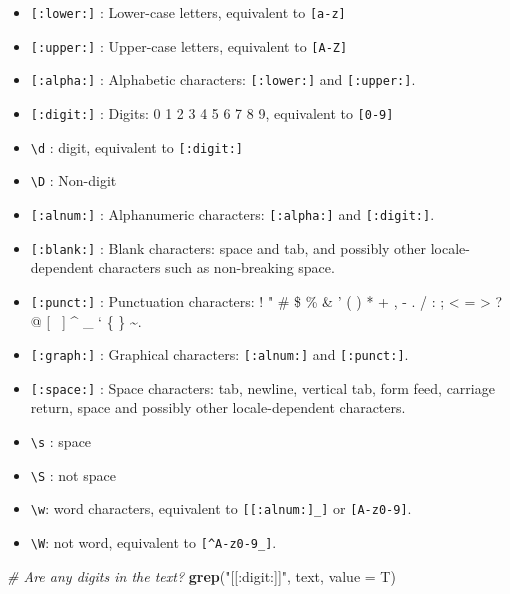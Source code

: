 \documentclass[
]{book}
\newenvironment{Shaded}{\begin{snugshade}}{\end{snugshade}}
\newcommand{\CommentTok}[1]{\textcolor[rgb]{0.56,0.35,0.01}{\textit{#1}}}
\newcommand{\DataTypeTok}[1]{\textcolor[rgb]{0.13,0.29,0.53}{#1}}
\newcommand{\KeywordTok}[1]{\textcolor[rgb]{0.13,0.29,0.53}{\textbf{#1}}}
\newcommand{\NormalTok}[1]{#1}
\newcommand{\StringTok}[1]{\textcolor[rgb]{0.31,0.60,0.02}{#1}}
\providecommand{\tightlist}{%
  \setlength{\itemsep}{0pt}\setlength{\parskip}{0pt}}
\begin{document}
\begin{itemize}
\tightlist
\item
  \texttt{{[}:lower:{]}} : Lower-case letters, equivalent to \texttt{{[}a-z{]}}
\item
  \texttt{{[}:upper:{]}} : Upper-case letters, equivalent to \texttt{{[}A-Z{]}}
\item
  \texttt{{[}:alpha:{]}} : Alphabetic characters: \texttt{{[}:lower:{]}} and \texttt{{[}:upper:{]}}.
\item
  \texttt{{[}:digit:{]}} : Digits: 0 1 2 3 4 5 6 7 8 9, equivalent to \texttt{{[}0-9{]}}
\item
  \texttt{\textbackslash{}d} : digit, equivalent to \texttt{{[}:digit:{]}}
\item
  \texttt{\textbackslash{}D} : Non-digit
\item
  \texttt{{[}:alnum:{]}} : Alphanumeric characters: \texttt{{[}:alpha:{]}} and \texttt{{[}:digit:{]}}.
\item
  \texttt{{[}:blank:{]}} : Blank characters: space and tab, and possibly other locale-dependent characters such as non-breaking space.
\item
  \texttt{{[}:punct:{]}} : Punctuation characters:
  ! " \# \$ \% \& ' ( ) * + , - . / : ; \textless{} = \textgreater{} ? @ {[} ~{]} \^{} \_ ` \{ \textbar{} \} \textasciitilde.
\item
  \texttt{{[}:graph:{]}} : Graphical characters: \texttt{{[}:alnum:{]}} and \texttt{{[}:punct:{]}}.
\item
  \texttt{{[}:space:{]}} : Space characters: tab, newline, vertical tab, form feed, carriage return, space and possibly other locale-dependent characters.
\item
  \texttt{\textbackslash{}s} : space
\item
  \texttt{\textbackslash{}S} : not space
\item
  \texttt{\textbackslash{}w}: word characters, equivalent to \texttt{{[}{[}:alnum:{]}\_{]}} or \texttt{{[}A-z0-9{]}}.
\item
  \texttt{\textbackslash{}W}: not word, equivalent to \texttt{{[}\^{}A-z0-9\_{]}}.
\end{itemize}

\begin{Shaded}
\begin{Highlighting}[]
\CommentTok{# Are any digits in the text?}
\KeywordTok{grep}\NormalTok{(}\StringTok{"[[:digit:]]"}\NormalTok{, text, }\DataTypeTok{value =}\NormalTok{ T)}
\end{Highlighting}
\end{Shaded}
\end{document}
